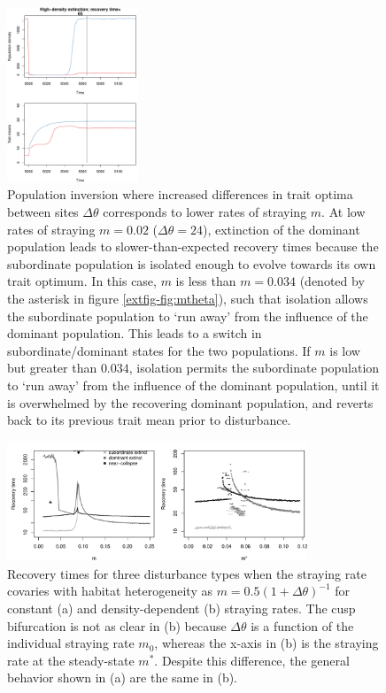 \documentclass{revtex4}
\begin{document}
\begin{figure}
  \captionsetup{justification=raggedright,
singlelinecheck=false
}
\centering
\includegraphics[width=0.35\textwidth]{fig_relax_inertia.pdf}
\caption{
Population inversion where increased differences in trait optima between sites $\Delta\theta$ corresponds to lower rates of straying $m$.
At low rates of straying $m=0.02$ ($\Delta\theta=24$), extinction of the dominant population leads to slower-than-expected recovery times because the subordinate population is isolated enough to evolve towards its own trait optimum. %
In this case, $m$ is less than $m=0.034$ (denoted by the asterisk in figure \ref{extfig-fig:mtheta}), such that isolation allows the subordinate population to `run away' from the influence of the dominant population.
This leads to a switch in subordinate/dominant states for the two populations.
If $m$ is low but greater than $0.034$, isolation permits the subordinate population to `run away' from the influence of the dominant population, until it is overwhelmed by the recovering dominant population, and reverts back to its previous trait mean prior to disturbance.
} \label{fig:inertia}
\end{figure}


\begin{figure}
  \captionsetup{justification=raggedright,
singlelinecheck=false
}
  \centering
  \includegraphics[width=0.8\textwidth]{fig_relax_mtheta.pdf}
  \caption{
  Recovery times for three disturbance types when the straying rate covaries with habitat heterogeneity as $m = 0.5(1 + \Delta\theta)^{-1}$ for constant (a) and density-dependent (b) straying rates.
  The cusp bifurcation is not as clear in (b) because $\Delta\theta$ is a function of the individual straying rate $m_0$, whereas the x-axis in (b) is the straying rate at the steady-state $m^*$.
  Despite this difference, the general behavior shown in (a) are the same in (b).
  } \label{fig:mthetamvm}
\end{figure}
\end{document}
